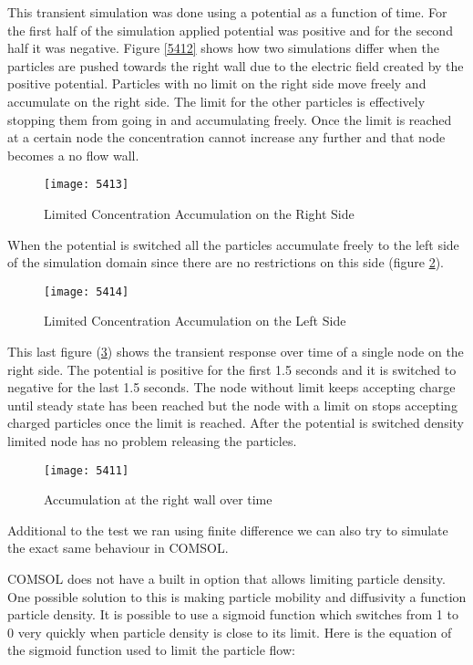 This transient simulation was done using a potential as a function of time. For the first half of the simulation applied potential was positive and for the second half it was negative. Figure \ref{5412} shows how two simulations differ when the particles are pushed towards the right wall due to the electric field created by the positive potential. Particles with no limit on the right side move freely and accumulate on the right side. The limit for the other particles is effectively stopping them from going in and accumulating freely. Once the limit is reached at a certain node the concentration cannot increase any further and that node becomes a no flow wall. 

\begin{figure}[!htp]
\centering
\texttt{[image: 5413]}
\caption{Limited Concentration Accumulation on the Right Side} 
\label{5413}
\end{figure}

When the potential is switched all the particles accumulate freely to the left side of the simulation domain since there are no restrictions on this side (figure \ref{5414}).
\begin{figure}[!htp]
\centering
\texttt{[image: 5414]}
\caption{Limited Concentration Accumulation on the Left Side} 
\label{5414}
\end{figure}

This last figure (\ref{5411}) shows the transient response  over time of a single node on the right side. The potential is positive for the first 1.5 seconds and it is switched to negative for the last 1.5 seconds. The node without limit keeps accepting charge until steady state has been reached but the node with a limit on stops accepting charged particles once the limit is reached. After the potential is switched density limited node has no problem releasing the particles.


\begin{figure}[!htp]
\centering
\texttt{[image: 5411]}
\caption{Accumulation at the right wall over time} 
\label{5411}
\end{figure}

Additional to the test we ran using finite difference we can also try to simulate the exact same behaviour in COMSOL. 

COMSOL does not have a built in option that allows limiting particle density. One possible solution to this is making particle mobility and diffusivity a function particle density. It is possible to use a sigmoid function which switches from 1 to 0 very quickly when particle density is close to its limit. Here is the equation of the sigmoid function used to limit the particle flow:

